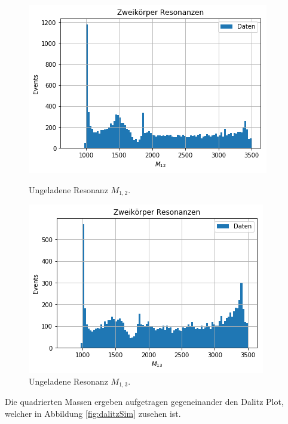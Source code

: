 \begin{figure}[htb]
  \centering
    \includegraphics[width=\linewidth]{plots/real_data_twobody_resonance_m12.png}
    \caption{Ungeladene Resonanz $M_{1,2}$.\label{fig:m12}}
  \endminipage\hfill
    \includegraphics[width=\linewidth]{plots/real_data_twobody_resonance_m13.png}
    \caption{Ungeladene Resonanz $M_{1,3}$.\label{fig:m13}}
  \endminipage
  \label{fig:resonances}
\end{figure}

Die quadrierten Massen ergeben aufgetragen gegeneinander den Dalitz Plot, welcher in Abbildung \ref{fig:dalitzSim} zusehen ist.


